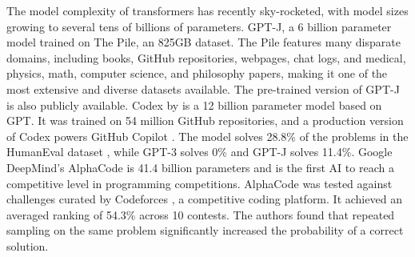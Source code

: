 The model complexity of transformers has recently sky-rocketed, with model sizes growing to several tens of billions of parameters. GPT-J, a 6 billion parameter model trained on The Pile, an 825GB dataset. The Pile features many disparate domains, including books, GitHub repositories, webpages, chat logs, and medical, physics, math, computer science, and philosophy papers, making it one of the most extensive and diverse datasets available. The pre-trained version of GPT-J is also publicly available. Codex by \textcite{chen2021codex} is a 12 billion parameter model based on GPT. It was trained on 54 million GitHub repositories, and a production version of Codex powers GitHub Copilot . The model solves 28.8\% of the problems in the HumanEval dataset , while GPT-3 solves 0\% and GPT-J solves 11.4\%. Google DeepMind's AlphaCode is 41.4 billion parameters and is the first AI to reach a competitive level in programming competitions. AlphaCode was tested against challenges curated by Codeforces , a competitive coding platform. It achieved an averaged ranking of 54.3\% across 10 contests. The authors found that repeated sampling on the same problem significantly increased the probability of a correct solution.



\newcommand*\emptycirc[1][1ex]{\tikz\draw (0,0) circle (#1);} 
\newcommand*\halfcirc[1][1ex]{%
  \begin{tikzpicture}
  \draw[fill] (0,0)-- (90:#1) arc (90:270:#1) -- cycle ;
  \draw (0,0) circle (#1);
  \end{tikzpicture}}
\newcommand*\fullcirc[1][1ex]{\tikz\fill (0,0) circle (#1);} 



